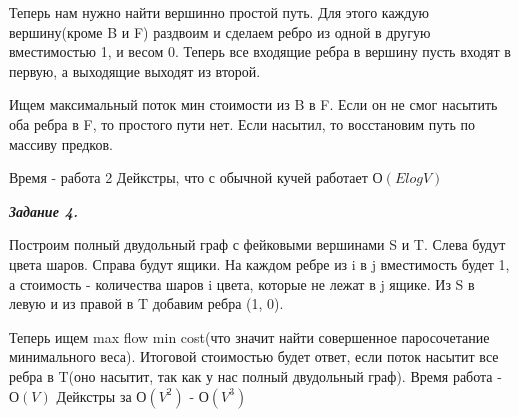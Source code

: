 \documentclass[12pt, a4paper]{scrartcl}
\begin{document}
	Теперь нам нужно найти вершинно простой путь. Для этого каждую вершину(кроме B и F) раздвоим и сделаем ребро из одной в другую вместимостью 
	1, и весом 0. Теперь все входящие ребра в вершину пусть входят в первую, а выходящие выходят из второй.\par
	
	Ищем максимальный поток мин стоимости из B в F. Если он не смог насытить оба ребра в F, то простого пути нет. Если насытил, то восстановим путь по массиву предков.\par
	Время - работа 2 Дейкстры, что с обычной кучей работает $О(ElogV)$
	
	\emph{\textbf{Задание 4.}}\par
	Построим полный двудольный граф с фейковыми вершинами S и T. Слева будут цвета шаров. Справа будут ящики. На каждом ребре из i в j вместимость будет 1, а стоимость - количества шаров i цвета, которые не лежат в j ящике. Из S в левую и из правой в T добавим ребра (1, 0).\par
	Теперь ищем max flow min cost(что значит найти совершенное паросочетание минимального веса). Итоговой стоимостью будет ответ, если поток насытит все ребра в T(оно насытит, так как у нас полный двудольный граф).
	Время работа - $О(V)$ Дейкстры за $О(V^2)$ - $О(V^3)$
\end{document}
